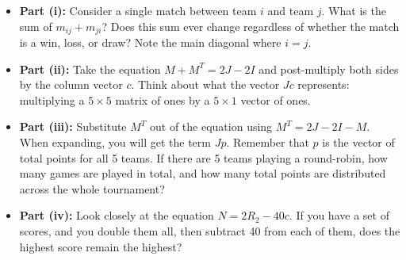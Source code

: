 \begin{hint}
\begin{itemize}
    \item \textbf{Part (i):} Consider a single match between team $i$ and team $j$. What is the sum of $m_{ij} + m_{ji}$? Does this sum ever change regardless of whether the match is a win, loss, or draw? Note the main diagonal where $i = j$.
    \item \textbf{Part (ii):} Take the equation $M + M^T = 2J - 2I$ and post-multiply both sides by the column vector $c$. Think about what the vector $Jc$ represents: multiplying a $5 \times 5$ matrix of ones by a $5 \times 1$ vector of ones. 
    \item \textbf{Part (iii):} Substitute $M^T$ out of the equation using $M^T = 2J - 2I - M$. When expanding, you will get the term $Jp$. Remember that $p$ is the vector of total points for all 5 teams. If there are 5 teams playing a round-robin, how many games are played in total, and how many total points are distributed across the whole tournament? 
    \item \textbf{Part (iv):} Look closely at the equation $N = 2R_2 - 40c$. If you have a set of scores, and you double them all, then subtract 40 from each of them, does the highest score remain the highest?
\end{itemize}
\end{hint}

